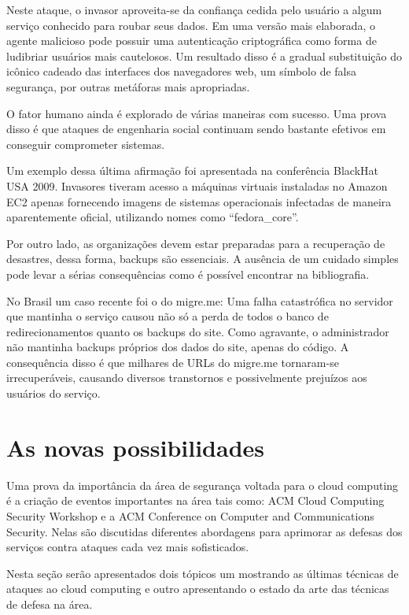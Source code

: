 \documentclass[brazil,12pt]{article}
\begin{document}
Neste ataque, o invasor aproveita-se da confiança cedida pelo usuário a algum
serviço conhecido para roubar seus dados. Em uma versão mais elaborada, o agente
malicioso pode possuir uma autenticação criptográfica como forma de ludibriar
usuários mais cautelosos. Um resultado disso é a gradual substituição do icônico
cadeado das interfaces dos navegadores web, um símbolo de falsa segurança,
por outras metáforas mais apropriadas.

O fator humano ainda é explorado de várias maneiras com sucesso. Uma prova disso
é que ataques de engenharia social continuam sendo bastante efetivos em
conseguir comprometer sistemas.

Um exemplo dessa última afirmação foi apresentada na conferência BlackHat USA
2009. Invasores tiveram acesso a máquinas virtuais instaladas no Amazon EC2
apenas fornecendo imagens de sistemas operacionais infectadas de maneira
aparentemente oficial, utilizando nomes como ``fedora\_core''.
\cite{whats-new-about-cloud-security}

Por outro lado, as organizações devem estar preparadas para a recuperação de
desastres, dessa forma, backups são essenciais. A ausência de um cuidado simples
pode levar a sérias consequências como é possível encontrar na bibliografia.

No Brasil um caso recente foi o do migre.me: Uma falha catastrófica no servidor
que mantinha o serviço causou não só a perda de todos o banco de 
redirecionamentos quanto os backups do site. Como agravante, o administrador 
não mantinha backups próprios dos dados do site, apenas do código. A
consequência disso é que milhares de URLs do migre.me tornaram-se
irrecuperáveis, causando diversos transtornos e possivelmente prejuízos aos
usuários do serviço.


\section{As novas possibilidades}
Uma prova da importância da área de segurança voltada para o cloud computing
é a criação de eventos importantes na área tais como: ACM Cloud Computing
Security Workshop e a ACM Conference on Computer and Communications Security.
Nelas são discutidas diferentes abordagens para aprimorar as defesas dos
serviços contra ataques cada vez mais sofisticados.

Nesta seção serão apresentados dois tópicos um mostrando as últimas técnicas de
ataques ao cloud computing e outro apresentando o estado da arte
das técnicas de defesa na área.
\end{document}
